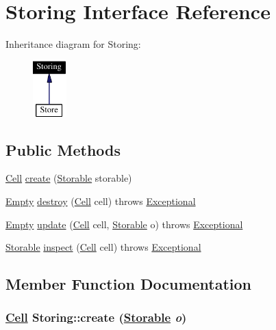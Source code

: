 \hypertarget{interfaceStoring}{
\section{Storing  Interface Reference}
\label{interfaceStoring}
}
Inheritance diagram for Storing:\begin{figure}[H]
\begin{center}
\leavevmode
\includegraphics[width=37pt]{interfaceStoring__inherit__graph}
\end{center}
\end{figure}
\subsection*{Public Methods}
\begin{CompactItemize}
\item 
\hyperlink{interfaceCell}{Cell} \hyperlink{interfaceStoring_a0}{create} (\hyperlink{interfaceStorable}{Storable} storable)
\item 
\hyperlink{interfaceEmpty}{Empty} \hyperlink{interfaceStoring_a1}{destroy} (\hyperlink{interfaceCell}{Cell} cell) throws \hyperlink{classExceptional}{Exceptional}
\item 
\hyperlink{interfaceEmpty}{Empty} \hyperlink{interfaceStoring_a2}{update} (\hyperlink{interfaceCell}{Cell} cell, \hyperlink{interfaceStorable}{Storable} o) throws \hyperlink{classExceptional}{Exceptional}
\item 
\hyperlink{interfaceStorable}{Storable} \hyperlink{interfaceStoring_a3}{inspect} (\hyperlink{interfaceCell}{Cell} cell) throws \hyperlink{classExceptional}{Exceptional}
\end{CompactItemize}


\subsection{Member Function Documentation}
\hypertarget{interfaceStoring_a0}{
\subsubsection[create]{\setlength{\rightskip}{0pt plus 5cm}\hyperlink{interfaceCell}{Cell} Storing::create (\hyperlink{interfaceStorable}{Storable} {\em o})}}
\label{interfaceStoring_a0}




